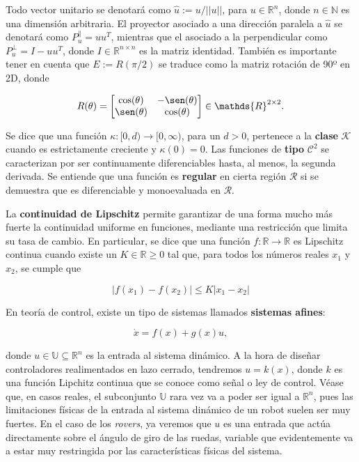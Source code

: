 Todo vector unitario se denotará como $\hat u := u/||u||$, para $u \in \mathds{R}^n$, donde $n \in \mathds{N}$ es una dimensión arbitraria. El proyector asociado a una dirección paralela a $\hat u$ se denotará como $P_u^{\parallel} = u u^T$, mientras que el asociado a la perpendicular como $P_u^{\perp} = I - u u^T$, donde $I \in \mathds{R}^{n \times n}$ es la matriz identidad. También es importante tener en cuenta que $E := R(\pi/2)$ se traduce como la matriz rotación de 90º en 2D, donde

\begin{equation} \label{eq: rot_matrix}
    R(\theta) =
    \left [
    \begin{matrix}
        \cos(\theta)  & -\sen(\theta) \\
        \sen(\theta) & \cos(\theta)
    \end{matrix}
    \right ] \in \mathds{R}^{2 \times 2}.
\end{equation}

Se dice que una función $\kappa : [0,d) \rightarrow [0,\infty)$, para un $d > 0$, pertenece a la \textbf{clase} $\mathcal{K}$ cuando es estrictamente creciente y $\kappa(0) = 0$. Las funciones de \textbf{tipo} $\mathcal{C}^2$ se caracterizan por ser continuamente diferenciables hasta, al menos, la segunda derivada. Se entiende que una función es \textbf{regular} en cierta región $\mathcal{R}$ si se demuestra que es diferenciable y monoevaluada en $\mathcal{R}$.

La \textbf{continuidad de Lipschitz} permite garantizar de una forma mucho más fuerte la continuidad uniforme en funciones, mediante una restricción que limita su tasa de cambio. En particular, se dice que una función $f: \mathds{R} \rightarrow \mathds{R}$ es Lipschitz continua cuando existe un $K \in \mathds{R} \geq 0$ tal que, para todos los números reales $x_1$ y $x_2$, se cumple que

$$
    |f(x_1) - f(x_2)| \leq K |x_1 - x_2|
$$

\newpage


En teoría de control, existe un tipo de sistemas llamados \textbf{sistemas afines}:

\begin{equation} \label{eq: affine}
    \dot x = f(x) + g(x)u,
\end{equation}

donde $u \in \mathds{U} \subseteq \mathds{R}^n$ es la entrada al sistema dinámico. A la hora de diseñar controladores realimentados en lazo cerrado, tendremos $u = k(x)$, donde $k$ es una función Lipchitz continua que se conoce como señal o ley de control. Véase que, en casos reales, el subconjunto $\mathds{U}$ rara vez va a poder ser igual a $\mathds{R}^n$, pues las limitaciones físicas de la entrada al sistema dinámico de un robot suelen ser muy fuertes. En el caso de los \textit{rovers}, ya veremos que $u$ es una entrada que actúa directamente sobre el ángulo de giro de las ruedas, variable que evidentemente va a estar muy restringida por las características físicas del sistema.

